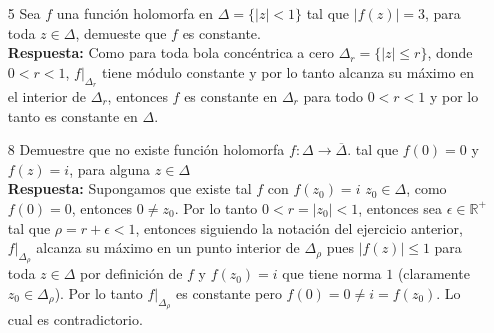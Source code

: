 \documentclass[letterpaper]{article}
\newcommand{\re}{\ensuremath{\mathbb R }}
\begin{document}
\begin{itemize}
  \item[5] Sea $f$ una función holomorfa en $\Delta=\{|z| < 1 \}$ tal que $|f(z)|=3$, para toda $z\in\Delta$, demueste que $f$ es constante.\\
        \textbf{Respuesta:} Como para toda bola concéntrica a cero $\Delta_{r}=\{|z|\leq r\}$, donde $0<r<1$, $f\vert_{\Delta_{r}}$ tiene módulo constante y por lo tanto alcanza su máximo en el interior de $\Delta_{r}$, entonces $f$ es constante en $\Delta_{r}$ para todo $0<r<1$ y por lo tanto es constante en $\Delta$.
  \item[8] Demuestre que no existe función holomorfa $f:\Delta\rightarrow\overline{\Delta}$. tal que $f(0)=0$ y $f(z)=i$, para alguna $z\in\Delta$\\
        \textbf{Respuesta:} Supongamos que existe tal $f$ con $f(z_{0})=i$ $z_{0}\in\Delta$, como $f(0)=0$, entonces $0\neq z_{0}$. Por lo tanto $0<r=|z_{0}|<1$, entonces sea $\epsilon\in\re^{+}$ tal que  $\rho=r+\epsilon < 1$, entonces siguiendo la notación del ejercicio anterior, $f\vert_{\Delta_{\rho}}$ alcanza su máximo en un punto interior de $\Delta_{\rho}$ pues $|f(z)|\leq 1$ para toda $z\in\Delta$ por definición de $f$ y  $f(z_{0})=i$ que tiene norma $1$ (claramente $z_{0}\in\Delta_{\rho}$). Por lo tanto $f\vert_{\Delta_{\rho}}$ es constante pero $f(0)=0\neq i=f(z_{0})$. Lo cual es contradictorio.
\end{itemize}
\end{document}
